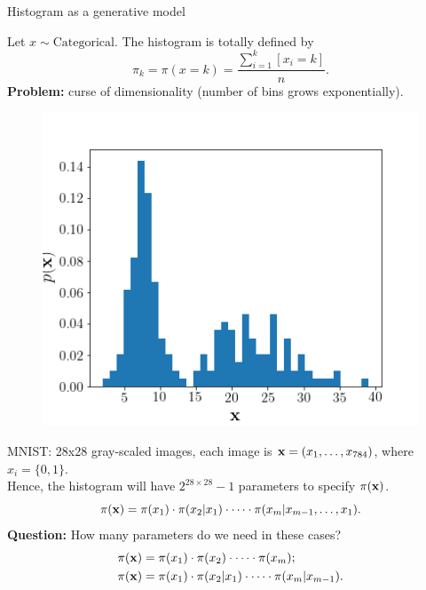 \begin{frame}{Histogram as a generative model}
	
	\begin{minipage}[t]{0.6\columnwidth}
	    Let $x \sim \text{Categorical}$. The histogram is totally defined by
		\[
		    \pi_k = \pi(x = k) = \frac{\sum_{i=1}^k [x_i = k]}{n}.
		\]
		\textbf{Problem:} curse of dimensionality (number of bins grows exponentially). \\
		\end{minipage}%
		\begin{minipage}[t]{0.4\columnwidth}
	    \begin{figure}[h]
	        \centering
	        \includegraphics[width=\linewidth]{figs/histogram.png}
	    \end{figure}
	\end{minipage}
			MNIST: 28x28 gray-scaled images, each image is $\mathbf{x} = (x_1, \dots, x_{784})$, where $x_i = \{0, 1\}$. \\
			Hence, the histogram will have $2^{28\times28} - 1$ parameters to specify $\pi(\mathbf{x})$.
	\[
	    \pi(\mathbf{x}) = \pi(x_1) \cdot \pi(x_2 | x_1) \cdot \dots \cdot \pi(x_m | x_{m-1}, \dots, x_1).
	\]
	\textbf{Question:} How many parameters do we need in these cases?
	\begin{align*}
	    \pi(\mathbf{x}) &= \pi(x_1) \cdot \pi(x_2)\cdot \dots \cdot \pi(x_m); \\
	    \pi(\mathbf{x}) &= \pi(x_1) \cdot \pi(x_2 | x_1) \cdot \dots \cdot \pi(x_m | x_{m-1}).
	\end{align*}
\end{frame}
